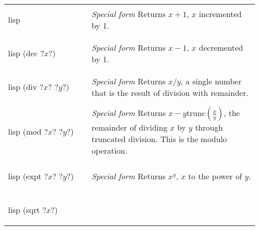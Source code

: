 \documentclass[a4paper, 12pt]{article}
\makeatletter
\newenvironment{funcdefs}
    {\begin{longtable}{@{} x{0.33\linewidth} @{} >{\raggedright\arraybackslash}p{0.66\linewidth} @{}}}
    {\end{longtable}}
\def\specialf/{\textit{Special form}\hspace{0.5em}}
\makeatother
\begin{document}
\begin{funcdefs}
\begin{minipage}[t]{\linewidth}
\begin{cminted}[autogobble=true, escapeinside=??]{lisp}
        \end{cminted}
    \end{minipage}
    & \specialf/ Returns $x + 1$, $x$ incremented by 1.
    \\ \\
    \begin{minipage}[t]{\linewidth}
        \centering
        \begin{cminted}[autogobble=true, escapeinside=??]{lisp}
            (dec ?$x$?)
        \end{cminted}
    \end{minipage}
    & \specialf/ Returns $x - 1$, $x$ decremented by 1.
    \\ \\
    \begin{minipage}[t]{\linewidth}
        \centering
        \begin{cminted}[autogobble=true, escapeinside=??]{lisp}
            (div ?$x$? ?$y$?)
        \end{cminted}
    \end{minipage}
    & \specialf/ Returns $x / y$, a single number that is the result of division with remainder.
    \\ \\
    \begin{minipage}[t]{\linewidth}
        \centering
        \begin{cminted}[autogobble=true, escapeinside=??]{lisp}
            (mod ?$x$? ?$y$?)
        \end{cminted}
    \end{minipage}
    & \specialf/ Returns $x - y$trunc$(\frac{x}{y})$, the remainder of dividing $x$ by $y$ through truncated division. This is the modulo operation.
    \\ \\
    \begin{minipage}[t]{\linewidth}
        \centering
        \begin{cminted}[autogobble=true, escapeinside=??]{lisp}
            (expt ?$x$? ?$y$?)
        \end{cminted}
    \end{minipage}
    & \specialf/ Returns $x^y$, $x$ to the power of $y$.
    \\ \\
    \begin{minipage}[t]{\linewidth}
        \centering
        \begin{cminted}[autogobble=true, escapeinside=??]{lisp}
            (sqrt ?$x$?)

\end{cminted}
\end{minipage}
\end{funcdefs}
\end{document}
